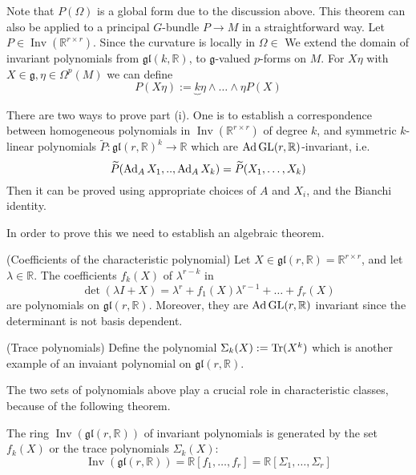 Note that $P(\Omega)$ is a global form due to the discussion above.
This theorem can also be applied to a principal $G$-bundle $P \to M$ in a 
straightforward way. Let $P\in\operatorname{Inv}(\mathbb{R}^{r\times r})$. 
Since the curvature is locally in $\Omega \in $ 
We extend the domain of invariant polynomials from
$\mathfrak{gl}(k,\mathbb{R})$, to $\mathfrak{g}$-valued  $p$-forms on  $M$. For
$X\eta$ with  $X\in \mathfrak{g},\eta\in\Omega^{p}(M)$ we can define
\[
	P(X\eta) := \underbrace{k}{\eta\wedge \ldots\wedge\eta}P(X)
\] 

There are two ways to prove part (i). One is to establish 
a correspondence between homogeneous polynomials 
in $\operatorname{Inv}(\mathbb{R}^{r\times r})$ of degree $k$, and symmetric
$k$-linear polynomials  $\widetilde{P}: \mathfrak{gl}(r,\mathbb{R})^{k}\to \mathbb{R}$
which are $\operatorname{Ad} \operatorname{GL}(r,\mathbb{R})$-invariant, i.e. 
\[
\widetilde{P}(\operatorname{Ad}_A X_1,..,\operatorname{Ad}_A X_k) = \widetilde{P}(X_1,\ldots,X_k)
\]
Then it can be proved using appropriate choices of $A$ and $X_i$, and the
Bianchi identity.

In order to prove this we need to establish an algebraic theorem.

\begin{ex} (Coefficients of the characteristic polynomial)
	Let $X \in \mathfrak{gl}(r,\mathbb{R}) = \mathbb{R}^{r\times r}$, and let $\lambda
	\in\mathbb{R}$. The coefficients $f_k(X)$  of $\lambda^{r-k}$ in 
	\[
	\det(\lambda I + X) = \lambda^{r} + f_1(X)\lambda^{r-1} + \ldots + f_r(X)
	\] 
	are polynomials on $\mathfrak{gl}(r,\mathbb{R})$. Moreover, they are $\operatorname{Ad}
	\operatorname{GL}(r,\mathbb{R})$ invariant since the determinant is not basis dependent.
\end{ex}
\begin{ex} (Trace polynomials)
	Define the polynomial $\Sigma_k(X) := \operatorname{Tr}(X^{k})$ which is another example
	of an invaiant polynomial on $\mathfrak{gl}(r,\mathbb{R})$.
\end{ex}
The two sets of polynomials above play a crucial role in characteristic classes,
because of the following theorem.
\begin{thm} \label{thm:invariant_poly}
	The ring $\operatorname{Inv}(\mathfrak{gl}(r,\mathbb{R}))$ of invariant
	polynomials is generated by the set $f_k(X)$ or the trace polynomials
	$\Sigma_k(X)$:
	\[
	\operatorname{Inv}(\mathfrak{gl}(r,\mathbb{R}))
	= \mathbb{R}[f_1,\ldots,f_r] = \mathbb{R}[\Sigma_1,\ldots,\Sigma_r]
	\] 
\end{thm}

